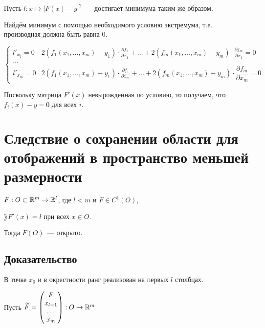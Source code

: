 \documentclass{article}
\begin{document}
            Пусть $l : x \mapsto \left| F(x) - y \right|^2$~--- достигает минимума таким же образом.
            
            Найдём минимум с помощью необходимого условию экстремума, т.е. производная должна быть равна $0$.
            
            \begin{equation*}
                \begin{cases}
   
                    l'_{x_1} = 0 & 2 (f_1 (x_1, \ldots, x_m) - y_1) \cdot \frac{\partial f_1}{\partial x_1} + \ldots + 2 (f_m (x_1, \ldots, x_m) - y_m) \cdot \frac{\partial f_m}{\partial x_1} = 0 \\
                    
                    \ldots \\
                    
                    l'_{x_m} = 0 & 2 (f_1 (x_1, \ldots, x_m) - y_1) \cdot \frac{\partial f_1}{\partial x_m} + \ldots + 2 (f_m (x_1, \ldots, x_m) - y_m) \cdot \dfrac{\partial f_m}{\partial x_m} = 0
                
                \end{cases}
            \end{equation*}
            
            Поскольку матрица $F'(x)$ невырожденная по условию, то получаем, что $f_i(x) - y = 0$ для всех $i$.
            
    \newpage
    
    \section{Следствие о сохранении области для отображений в пространство меньшей размерности}
    
        $F : O \subset \mathbb{R}^m \rightarrow \mathbb{R}^l$, где $l < m$ и $F \in C^1(O)$,
        
        $\rang F'(x) = l$ при всех $x \in O$.
        
        Тогда $F(O)$~--- открыто.
        
        \subsection{Доказательство}
        
            В точке $x_0$ и в окрестности ранг реализован на первых $l$ столбцах. 
            
            Пусть $\widetilde{F} = \begin{pmatrix} F \\ x_{l + 1} \\ \ldots \\ x_{m} \end{pmatrix} : O \rightarrow \mathbb{R}^m$
            
\end{document}

